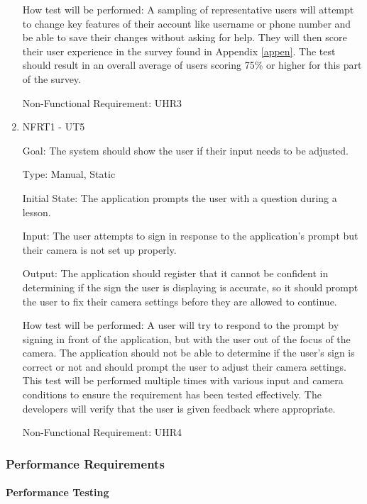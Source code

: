 \documentclass[12pt, titlepage]{article}
\begin{document}
\begin{enumerate}
How test will be performed: A sampling of representative users will attempt to change key features of their account like username or phone number and be able to save their changes without asking for help. They will then score their user experience in the survey found in Appendix \ref{appen}. The test should result in an overall average of users scoring 75\% or higher for this part of the survey.

Non-Functional Requirement: UHR3

\item{NFRT1 - UT5}

Goal: The system should show the user if their input needs to be adjusted. 

Type: Manual, Static
					
Initial State: The application prompts the user with a question during a lesson.
					
Input: The user attempts to sign in response to the application's prompt but their camera is not set up properly.
					
Output: The application should register that it cannot be confident in determining if the sign the user is displaying is accurate, so it should prompt the user to fix their camera settings before they are allowed to continue.
					
How test will be performed: A user will try to respond to the prompt by signing in front of the application, but with the user out of the focus of the camera. The application should not be able to determine if the user's sign is correct or not and should prompt the user to adjust their camera settings. This test will be performed multiple times with various input and camera conditions to ensure the requirement has been tested effectively. The developers will verify that the user is given feedback where appropriate. 

Non-Functional Requirement: UHR4

\end{enumerate}

\subsubsection{Performance Requirements}

\paragraph{Performance Testing}
\end{document}
